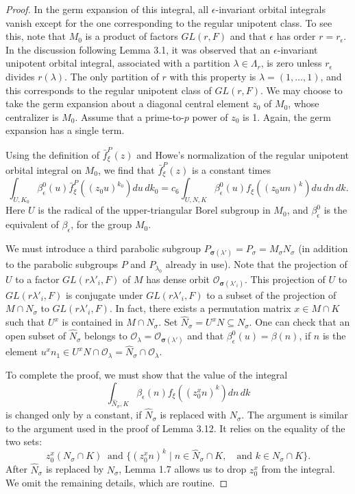 \documentclass{amsart}
\begin{document}
\begin{proof}
In the germ expansion of this integral, all
$\epsilon$-invariant orbital integrals vanish except for the one
corresponding to the regular unipotent  class.  To see this, note that $M_0$
is a product of factors $GL(r,F)$ and that $\epsilon$ has order
$r=r_\epsilon$.  In the discussion following Lemma 3.1, it was observed
that an $\epsilon$-invariant unipotent orbital integral, 
associated with a partition
$\lambda\in\Lambda_r$, is zero unless $r_\epsilon$ divides $r(\lambda)$.
The only partition of $r$ with this property is $\lambda=(1,\ldots,1)$,
and this corresponds to the regular unipotent class of $GL(r,F)$.
We may choose to take the germ expansion about a diagonal central element $z_0$
of $M_0$, whose centralizer is $M_0$.  Assume that
a prime-to-$p$ power of $z_0$ is 1.  Again, the germ expansion has a single term.

Using the definition of $\bar f_\xi^P(z)$ and Howe's normalization of
the regular unipotent orbital integral on $M_0$, we find that
$\bar f_\xi^P(z)$ is a constant times
$$\int_{U,K_0} \beta^0_\epsilon(u)\bar f_\xi^P((z_0u)^{k_0}) du\,dk_0 =
	c_6\int_{U,N,K} \beta_\epsilon^0(u) f_\xi((z_0un)^k) du\,dn\,dk.$$
Here $U$ is the radical of the upper-triangular Borel subgroup
in $M_0$, and $\beta_\epsilon^0$ is the equivalent of $\beta_\epsilon$,
for the group $M_0$.

We must introduce a third parabolic subgroup $P_{\pmb\sigma(\lambda')} =
P_\sigma=M_\sigma N_\sigma$ (in addition to the parabolic subgroups
$P$ and $P_{\lambda_0}$ already in use).  Note that the
projection of $U$ to a factor $GL(r\lambda'_i,F)$ of $M$ has
dense orbit ${\mathcal O}_{\pmb\sigma(\lambda'_i)}$.  This projection
of $U$ to $GL(r\lambda'_i,F)$ is conjugate under $GL(r\lambda'_i,F)$ to
a subset of the projection of $M\cap N_\sigma$ to $GL(r\lambda'_i,F)$.  
In fact,
there exists a permutation matrix $x\in M\cap K$ such that $U^x$ is contained
in $M\cap N_\sigma$.  Set
$\hat N_\sigma = U^xN\subseteq N_\sigma$.  One can check that
an open subset of $\hat N_\sigma$ belongs to ${\mathcal O}_\lambda = {\mathcal O}_{\pmb\sigma(\lambda')}$
and that $\beta^0_\epsilon(u) = \beta(n)$, if $n$ is the element
$u^xn_1\in U^xN \cap
{\mathcal O}_{\lambda} = \hat N_\sigma\cap {\mathcal O}_\lambda$.

To complete the proof, we must show that the value of the integral
$$\int_{\hat N_{\sigma},K} \beta_\epsilon(n) f_\xi((z_0^xn)^k) dn\,dk$$
is changed only by a constant, if $\hat N_\sigma$ is replaced with
$N_\sigma$.  The argument is similar to the argument used in the
proof of Lemma 3.12.  It relies on the equality of the two sets:
$$z_0^x(N_\sigma\cap K)\ \text{ and } \{(z_0^xn)^k\mid n\in \hat N_\sigma\cap K,
\quad \text{and } k\in N_\sigma\cap K\}.$$
After $\hat N_\sigma$ is replaced by $N_\sigma$, Lemma 1.7 allows us to drop
$z_0^x$ from the integral.  We omit the remaining details, which are routine.
\end{proof}
\end{document}
